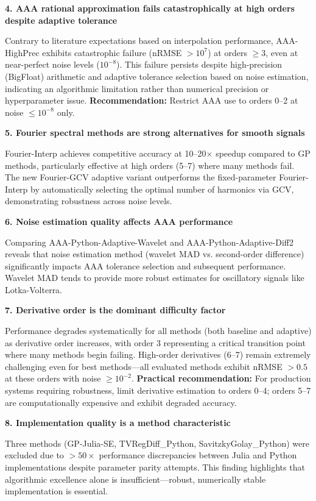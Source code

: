 \textbf{4. AAA rational approximation fails catastrophically at high orders despite adaptive tolerance}

Contrary to literature expectations based on interpolation performance, AAA-HighPrec exhibits catastrophic failure (nRMSE $> 10^7$) at orders $\geq 3$, even at near-perfect noise levels ($10^{-8}$). This failure persists despite high-precision (BigFloat) arithmetic and adaptive tolerance selection based on noise estimation, indicating an algorithmic limitation rather than numerical precision or hyperparameter issue. \textbf{Recommendation:} Restrict AAA use to orders 0--2 at noise $\leq 10^{-8}$ only.

\textbf{5. Fourier spectral methods are strong alternatives for smooth signals}

Fourier-Interp achieves competitive accuracy at 10--20$\times$ speedup compared to GP methods, particularly effective at high orders (5--7) where many methods fail. The new Fourier-GCV adaptive variant outperforms the fixed-parameter Fourier-Interp by automatically selecting the optimal number of harmonics via GCV, demonstrating robustness across noise levels.

\textbf{6. Noise estimation quality affects AAA performance}

Comparing AAA-Python-Adaptive-Wavelet and AAA-Python-Adaptive-Diff2 reveals that noise estimation method (wavelet MAD vs. second-order difference) significantly impacts AAA tolerance selection and subsequent performance. Wavelet MAD tends to provide more robust estimates for oscillatory signals like Lotka-Volterra.

\textbf{7. Derivative order is the dominant difficulty factor}

Performance degrades systematically for all methods (both baseline and adaptive) as derivative order increases, with order 3 representing a critical transition point where many methods begin failing. High-order derivatives (6--7) remain extremely challenging even for best methods—all evaluated methods exhibit nRMSE $> 0.5$ at these orders with noise $\geq 10^{-2}$. \textbf{Practical recommendation:} For production systems requiring robustness, limit derivative estimation to orders 0--4; orders 5--7 are computationally expensive and exhibit degraded accuracy.

\textbf{8. Implementation quality is a method characteristic}

Three methods (GP-Julia-SE, TVRegDiff\_Python, SavitzkyGolay\_Python) were excluded due to $> 50\times$ performance discrepancies between Julia and Python implementations despite parameter parity attempts. This finding highlights that algorithmic excellence alone is insufficient—robust, numerically stable implementation is essential.

